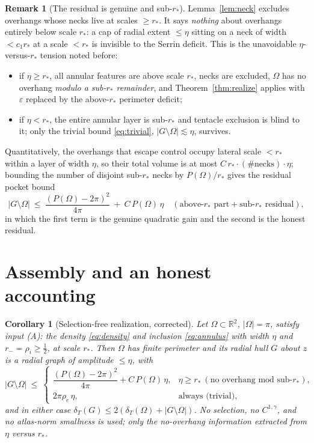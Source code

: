 \documentclass[11pt]{article}
\newtheorem{corollary}[theorem]{Corollary}
\theoremstyle{definition}
\newtheorem{remark}[theorem]{Remark}
\newcommand{\R}{\mathbb R}
\newcommand{\Om}{\Omega}
\newcommand{\eps}{\varepsilon}
\newcommand{\dT}{\delta_T}
\newcommand{\abs}[1]{\left|#1\right|}
\begin{document}
\begin{remark}[The residual is genuine and sub-$r_*$]\label{rem:residual}
Lemma~\ref{lem:neck} excludes overhangs whose necks live at scales
$\ge r_*$. It says \emph{nothing} about overhangs entirely below scale
$r_*$: a cap of radial extent $\le\eta$ sitting on a neck of width
$<c_1r_*$ at a scale $<r_*$ is invisible to the Serrin deficit. This is the
unavoidable $\eta$-versus-$r_*$ tension noted before:
\begin{itemize}[leftmargin=2em]
\item if $\eta\ge r_*$, all annular features are above scale $r_*$, necks
are excluded, $\Om$ has no overhang \emph{modulo a sub-$r_*$ remainder},
and Theorem~\ref{thm:realize} applies with $\eps$ replaced by the
above-$r_*$ perimeter deficit;
\item if $\eta<r_*$, the entire annular layer is sub-$r_*$ and tentacle
exclusion is blind to it; only the trivial bound \eqref{eq:trivial},
$|G\setminus\Om|\lesssim\eta$, survives.
\end{itemize}
Quantitatively, the overhangs that escape control occupy lateral scale
$<r_*$ within a layer of width $\eta$, so their total volume is at most
$C\,r_*\cdot(\#\text{necks})\cdot\eta$; bounding the number of disjoint
sub-$r_*$ necks by $P(\Om)/r_*$ gives the residual pocket bound
\begin{equation}\label{eq:residual}
   \abs{G\setminus\Om}\ \le\ \frac{(P(\Om)-2\pi)^2}{4\pi}
   \ +\ C\,P(\Om)\,\eta\quad(\text{above-}r_*\text{ part}+\text{sub-}r_*\text{ residual}),
\end{equation}
in which the first term is the genuine quadratic gain and the second is the
honest residual.
\end{remark}

\section{Assembly and an honest accounting}

\begin{corollary}[Selection-free realization, corrected]\label{cor:assembly}
Let $\Om\subset\R^2$, $|\Om|=\pi$, satisfy input (A): the density
\eqref{eq:density} and inclusion \eqref{eq:annulus} with width $\eta$ and
$r_-=\rho_i\ge\tfrac12$, at scale $r_*$. Then $\Om$ has finite perimeter
and its radial hull $G$ about $z$ is a radial graph of amplitude $\le\eta$,
with
\[
   \abs{G\setminus\Om}\ \le\
   \begin{cases}
     \dfrac{(P(\Om)-2\pi)^2}{4\pi}+C\,P(\Om)\,\eta, & \eta\ge r_*\ (\text{no overhang mod sub-}r_*),\\[2ex]
     2\pi\rho_e\,\eta, & \text{always (trivial)},
   \end{cases}
\]
and in either case $\dT(G)\le 2(\dT(\Om)+|G\setminus\Om|)$. No selection,
no $C^{1,\gamma}$, and no atlas-norm smallness is used; only the
no-overhang information extracted from $\eta$ versus $r_*$.
\end{corollary}
\end{document}

